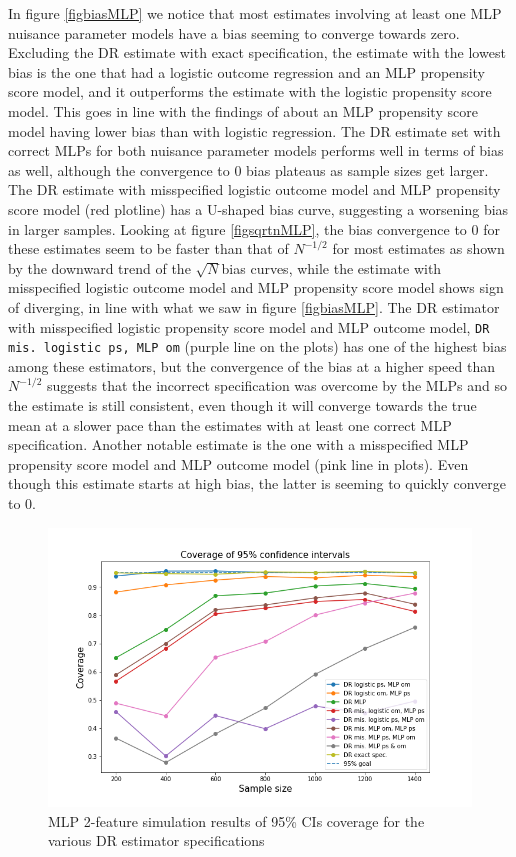 \documentclass[12pt,twoside]{article}
\begin{document}
In figure \ref{figbiasMLP} we notice that most estimates involving at least one MLP nuisance parameter models have a bias seeming to converge towards zero. Excluding the DR estimate with exact specification, the estimate with the lowest bias is the one that had a logistic outcome regression and an MLP propensity score model, and it outperforms the estimate with the logistic propensity score model. This goes in line with the findings of \citet{setoguchi-nn} about an MLP propensity score model having lower bias than with logistic regression. The DR estimate set with correct MLPs for both nuisance parameter models performs well in terms of bias as well, although the convergence to 0 bias plateaus as sample sizes get larger. The DR estimate with misspecified logistic outcome model and MLP propensity score model (red plotline) has a U-shaped bias curve, suggesting a worsening bias in larger samples. Looking at figure \ref{figsqrtnMLP}, the bias convergence to 0 for these estimates seem to be faster than that of $N^{-1/2}$ for most estimates as shown by the downward trend of the $\sqrt{N}$bias curves, while the estimate with misspecified logistic outcome model and MLP propensity score model shows sign of diverging, in line with what we saw in figure \ref{figbiasMLP}. The DR estimator with misspecified logistic propensity score model and MLP outcome model, \texttt{DR mis. logistic ps, MLP om} (purple line on the plots) has one of the highest bias among these estimators, but the convergence of the bias at a higher speed than $N^{-1/2}$ suggests that the incorrect specification was overcome by the MLPs and so the estimate is still consistent, even though it will converge towards the true mean at a slower pace than the estimates with at least one correct MLP specification. Another notable estimate is the one with a misspecified MLP propensity score model and MLP outcome model (pink line in plots). Even though this estimate starts at high bias, the latter is seeming to quickly converge to 0.

\begin{figure}[h!]
    \centering
    \includegraphics[width = 0.9\columnwidth]{figures/CIMLP.png}
    \caption{MLP 2-feature simulation results of 95\% CIs coverage for the various DR estimator specifications}
    \label{figCIMLP}
\end{figure}
\end{document}
